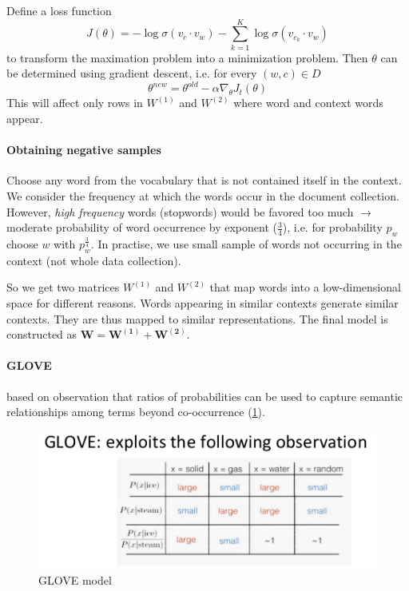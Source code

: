 Define a loss function
$$ J(\theta) = -\log \sigma(v_c \cdot v_w) - \sum^K_{k=1} \log \sigma(v_{c_k} \cdot v_w)
$$
to transform the maximation problem into a minimization problem. Then $\theta$ can be determined using gradient descent, i.e. for every $(w,c) \in D$
$$ \theta^{new} = \theta^{old} - \alpha \nabla_\theta J_t(\theta)
$$
This will affect only rows in $W^{(1)}$ and $W^{(2)}$ where word and context words appear.

\paragraph{Obtaining negative samples} Choose any word from the vocabulary that is not contained itself in the context. We consider the frequency at which the words occur in the document collection. However, \emph{high frequency} words (stopwords) would be favored too much $\longrightarrow$ moderate probability of word occurrence by exponent ($\frac{3}{4}$), i.e. for probability $p_w$ choose $w$ with $p_w^{\frac{3}{4}}$. In practise, we use small sample of words not occurring in the context (not whole data collection).

So we get two matrices $W^{(1)}$ and $W^{(2)}$ that map words into a low-dimensional space for different reasons. Words appearing in similar contexts generate similar contexts. They are thus mapped to similar representations. The final model is constructed as $\mathbf{W = W^{(1)} + W^{(2)}}$.

\paragraph{GLOVE} based on observation that ratios of probabilities can be used to capture semantic relationships among terms beyond co-occurrence (\cref{fig:GLOVE}).

\begin{figure}
  \centering
  \includegraphics[width=\linewidth]{figures/GLOVE.png}
  \caption{GLOVE model}
  \label{fig:GLOVE}
\end{figure}

